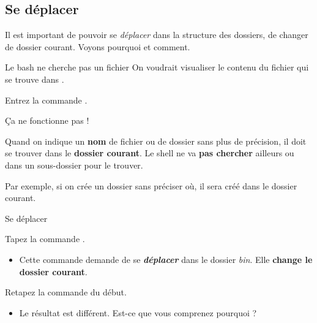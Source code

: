 \documentclass[a4paper,11pt]{style-esi/td}
\begin{document}
	\subsection{Se déplacer}

		Il est important de pouvoir se \emph{déplacer} 
		dans la structure des dossiers, de changer de dossier courant.
		Voyons pourquoi et comment.

		\begin{Experience}{Le bash ne cherche pas un fichier}
			On voudrait visualiser le contenu du fichier 
			qui se trouve dans .
			\begin{steps}
				\item Entrez la commande .
			\end{steps}
			\c Ca ne fonctionne pas !
		\end{Experience}

		\begin{alertbox}
			Quand on indique un \textbf{nom} de fichier ou de dossier sans plus de précision,
			il doit se trouver dans le \textbf{dossier courant}.
			Le shell ne va \textbf{pas chercher} ailleurs ou dans un sous-dossier 
			pour le trouver. 
		\end{alertbox}

		Par exemple, si on crée un dossier sans préciser où,
		il sera créé dans le dossier courant.

		\newpage
		\begin{Experience}{Se déplacer}  
			\vspace{-1em}
			\begin{steps}
			\item 
				Tapez la commande \kbd{cd bin}.
				\begin{itemize}
				\item 
					Cette commande demande de se \textit{\textbf{déplacer}} 
					dans le dossier \textit{bin}.
					Elle \textbf{change le dossier courant}.
				\end{itemize}
			\item 
				Retapez la commande \kbd{ls} du début.
				\begin{itemize}
				\item Le résultat est différent. 
					Est-ce que vous comprenez pourquoi ?
				\end{itemize}
			\end{steps}
		\end{Experience}
		
\end{document}
